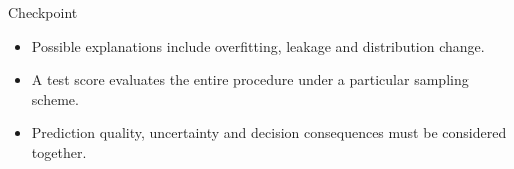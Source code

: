 \begin{frame}{Checkpoint}
\begin{itemize}
\item Possible explanations include overfitting, leakage and distribution change.
\item A test score evaluates the entire procedure under a particular sampling scheme.
\item Prediction quality, uncertainty and decision consequences must be considered together.
\end{itemize}
\end{frame}
